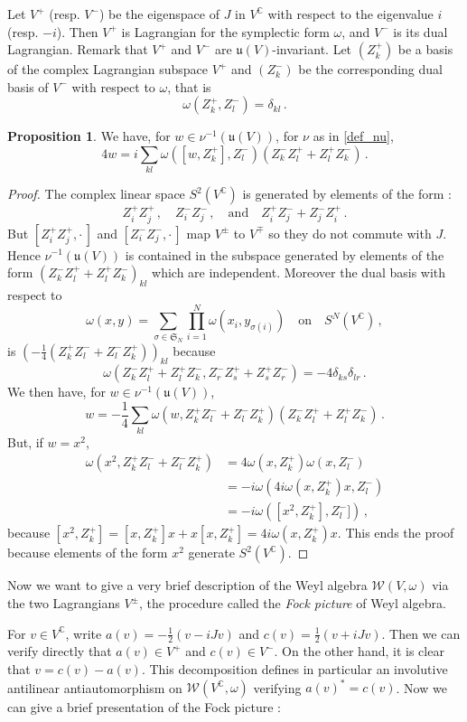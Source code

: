 \documentclass{amsart}[draft,11pt]
\numberwithin{equation}{section}
\theoremstyle{definition}
\newtheorem{proposition}[theorem]{Proposition}
\begin{document}
Let  $V^+$ (resp. $V^-$) be the eigenspace of $J$ in $V^\mathbb{C}$ with respect to the eigenvalue $i$ (resp.  $-i$). Then $V^+$ is Lagrangian for the symplectic form $\omega$, and  $V^-$ is its dual Lagrangian. Remark that  $V^+$ and  $V^-$  are $\mathfrak{u}(V)$-invariant. Let $(Z_k^+)$ be a basis of the complex Lagrangian subspace $V^+$ and 
$(Z_k^-)$ be the corresponding dual basis of $V^-$ with respect to $\omega$, that is 
$$
\omega(Z_k^+,Z_l^-)=\delta_{kl}\,.
$$
\begin{proposition}\label{unitary}
We have, for $w\in\nu^{-1}(\mathfrak{u}(V))$, for $\nu$ as in \eqref{def_nu},
$$
4w=i\sum_{kl}\omega([w,Z_k^+],Z_l^-)(Z_k^-Z_l^++Z_l^+Z_k^-)\,.
$$
\end{proposition}
\begin{proof}
The complex linear space $S^2(V^\mathbb{C})$ is generated by elements of the form :
$$ Z_i^+Z_j^+\,,\quad Z_i^-Z_j^-\,,\quad \text{and}\quad
Z_i^+Z_j^-+Z_j^-Z_i^+\,.$$
But $[Z_i^+Z_j^+,\cdot\,]$ and $[Z_i^-Z_j^-,\cdot\, ]$ map
$V^\pm$ to $V^\mp$ so they do not commute with $J$.
Hence $\nu^{-1}(\mathfrak{u}(V))$ is contained in the subspace generated by elements of the form  $(Z_k^-Z_l^++Z_l^+Z_k^-)_{kl}$ which are independent. Moreover
the dual basis with respect to 
$$\omega (x,y) = \sum_{\sigma \in \mathfrak{S}_N} \prod_{i=1}^{N} \omega (x_i,y_{\sigma(i)}) \quad \text{on}\quad S^N(V^\mathbb{C})\,,$$
is $(-\frac{1}{4}(Z_k^+Z_l^-+Z_l^-Z_k^+))_{kl}$ because
$$ \omega (Z_k^-Z_l^++Z_l^+Z_k^-,Z_r^-Z_s^++Z_s^+Z_r^-) = -4 \delta_{ks}\delta_{lr} \,.$$
We then have, for $w\in \nu^{-1}(\mathfrak{u}(V))$,
$$w=-\frac14\sum_{kl}\omega(w,Z_k^+Z_l^-+Z_l^-Z_k^+)
(Z_k^-Z_l^++Z_l ^+Z_k^-)\,.$$
But, if $w=x^2$,
\begin{align*}
\omega(x^2,Z_k^+Z_l^-+Z_l^-Z_k^+)
&=4\omega(x,Z_k^+)\omega(x,Z_l^-) \\
&=-i\omega(4i\omega(x,Z_k^+)x,Z_l^-)\\
&= -i\omega([x^2,Z_k^+],Z_l^-])\,,
\end{align*}
because $[x^2,Z_k^+]=[x,Z_k^+]x+x[x,Z_k^+]=4i\omega(x,Z_k^+)x$.
This ends the proof because elements
of the form $x^2$ generate $S^2(V^\mathbb{C})$. 
\end{proof}

Now we want to give a  very brief description of the Weyl algebra  $\mathcal{W}(V,\omega)$ via the two Lagrangians $V^\pm$, the procedure  called  the \emph{Fock picture} of Weyl algebra.
 

For  $v\in V^\mathbb{C}$, write $a(v)=-\frac12(v - iJv)$ and $c(v) = \frac12 ( v + iJv)$. Then we can verify directly that $a(v)\in V^+$ and $c(v)\in V^-$. 
On the other hand, it is clear that $v=c(v) - a(v)$. This decomposition defines in particular an involutive antilinear antiautomorphism on $\mathcal{W}(V^\mathbb{C},\omega)$ verifying $a(v)^* = c(v)$. Now we can give a brief presentation of the Fock picture :
\end{document}

